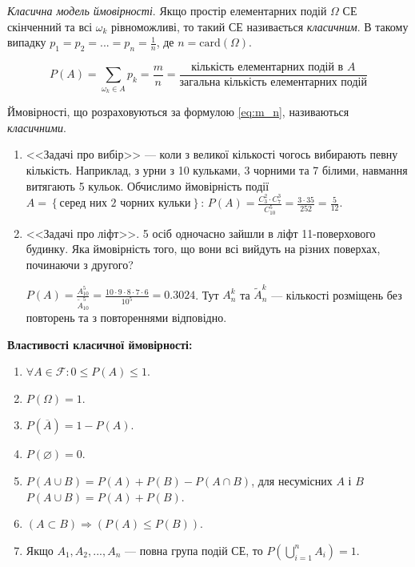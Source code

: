 \begin{example}
    \emph{Класична модель ймовірності}. Якщо простір елементарних подій $\Omega$ СЕ скінченний
    та всі $\omega_k$ рівноможливі, то такий СЕ називається \emph{класичним}.
    В такому випадку $p_1 = p_2 = ... = p_n = \frac{1}{n}$, де $n = \mathrm{card}(\Omega)$.
    
    \begin{equation}\label{eq:m_n}
        P(A) = \sum_{\omega_k \in A} p_k = \frac{m}{n} = \frac{\text{кількість елементарних подій в } A}{\text{загальна кількість елементарних подій}}
    \end{equation}
\end{example}
Ймовірності, що розраховуються за формулою \eqref{eq:m_n}, називаються \emph{класичними}.
\begin{example}
    \begin{enumerate}
        \item <<Задачі про вибір>> --- коли з великої кількості чогось вибирають певну кількість.
        Наприклад, з урни з 10 кульками, 3 чорними та 7 білими, навмання витягають 5 кульок.
        Обчислимо ймовірність події $A = \left\{ \text{серед них 2 чорних кульки}\right\}$:
        $P(A) = \frac{C_3^2\cdot C_7^3}{C_{10}^5} = \frac{3\cdot 35}{252} = \frac{5}{12}$.
        \item <<Задачі про ліфт>>. 5 осіб одночасно зайшли в ліфт 11-поверхового будинку. 
        Яка ймовірність того, що вони всі вийдуть на різних поверхах, починаючи з другого?
        
        $P(A) = \frac{A_{10}^5}{\widetilde{A}_{10}^5} = \frac{10\cdot 9\cdot 8\cdot 7 \cdot 6}{10^5} = 0.3024$. 
        Тут $A_n^k$ та $\widetilde{A}_n^k$ --- кількості розміщень без повторень та з повтореннями відповідно.
    \end{enumerate}
\end{example}

\textbf{Властивості класичної ймовірності:}
\begin{enumerate}
    \item $\forall A \in \mathcal{F}: 0 \leq P(A) \leq 1$.
    \item $P(\Omega) = 1$.
    \item $P(\overline{A}) = 1 - P(A)$.
    \item $P(\varnothing) = 0$.
    \item $P(A\cup B) = P(A) + P(B) - P(A\cap B)$, для несумісних $A$ і $B$ $P(A\cup B) = P(A) + P(B)$.
    \item $\left( A \subset B\right) \Rightarrow \left( P(A) \leq P(B)\right)$.
    \item Якщо $A_1, A_2, ..., A_n$ --- повна група подій СЕ, то $P(\bigcup_{i=1}^{n} A_i) = 1$.
\end{enumerate}